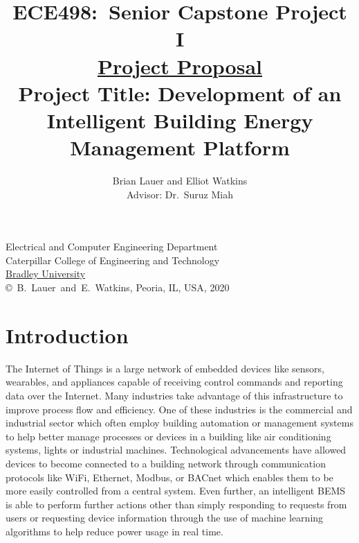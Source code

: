 \documentclass[letterpaper,12pt]{article}   %
\title{ECE498:~Senior Capstone Project I\\\textbf{\underline{Project Proposal}}\\
\vspace{0.5in}
Project Title: Development of an Intelligent Building Energy Management Platform}
\author{Brian Lauer and Elliot Watkins\\ Advisor: Dr.~Suruz Miah
}
\date{}  %
\begin{document}
\begin{titlepage}
 \maketitle

\vspace*{4.0cm}
\begin{center}
\normalsize
Electrical and Computer Engineering Department\\
Caterpillar College of Engineering and Technology\\
\href{http://www.bradley.edu/}{Bradley University}\\

\vspace*{6.0cm}
\copyright~B.~Lauer~and~E.~Watkins, Peoria, IL, USA, 2020\\

\end{center}
\thispagestyle{empty}

\end{titlepage} 
\newpage
\renewcommand{\contentsname}{Table of Contents}
\tableofcontents
\newpage

\section{Introduction} %
The Internet of Things is a large network of embedded devices like sensors, wearables, and appliances capable of receiving control commands and reporting data over the Internet. Many industries take advantage of this infrastructure to improve process flow and efficiency. One of these industries is the commercial and industrial sector which often employ building automation or management systems to help better manage processes or devices in a building like air conditioning systems, lights or industrial machines. Technological advancements have allowed devices to become connected to a building network through communication protocols like WiFi, Ethernet, Modbus, or BACnet which enables them to be more easily controlled from a central system. Even further, an intelligent BEMS is able to perform further actions other than simply responding to requests from users or requesting device information through the use of machine learning algorithms to help reduce power usage in real time.
\end{document}
